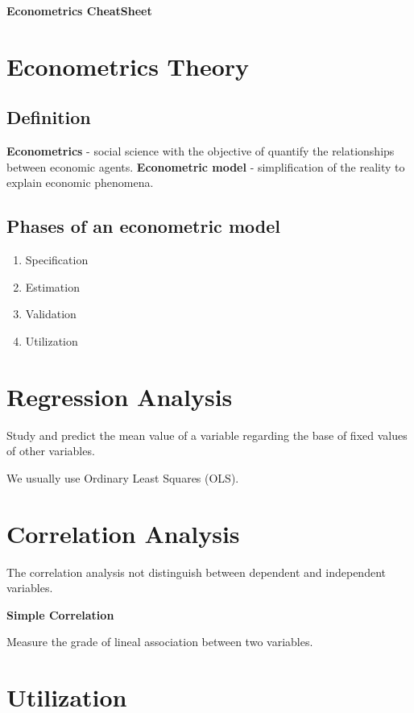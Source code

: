 \documentclass[10pt,landscape]{article}
\begin{document}
\begin{center}
\textbf{\Large Econometrics CheatSheet}
\end{center}

\begin{multicols}{3}
\section*{Econometrics Theory}
\subsection*{Definition}
\textbf{Econometrics} - social science with the objective of quantify the relationships between economic agents.
\textbf{Econometric model} - simplification of the reality to explain economic phenomena.

\subsection*{Phases of an econometric model}
\begin{enumerate}
	\item Specification
	\item Estimation
	\item Validation
	\item Utilization
\end{enumerate}

\section*{Regression Analysis}
Study and predict the mean value of a variable regarding the base of fixed values of other variables.

We usually use Ordinary Least Squares (OLS).


\section*{Correlation Analysis}
The correlation analysis not distinguish between dependent and independent variables.

\textbf{Simple Correlation}

Measure the grade of lineal association between two variables.



\section*{Utilization}

\end{multicols}
\end{document}
